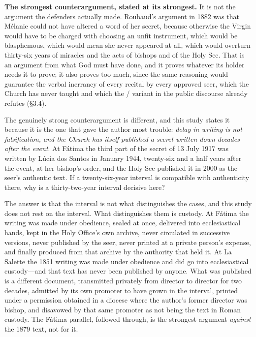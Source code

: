 \textbf{The strongest counterargument, stated at its strongest.}
It is not the argument the defenders actually made. Roubaud's
argument in 1882 was that Mélanie could not have altered a word of
her secret, because otherwise the Virgin would have to be charged
with choosing an unfit instrument, which would be blasphemous, which
would mean she never appeared at all, which would overturn
thirty-six years of miracles and the acts of bishops and of the Holy
See. That is an argument from what God must have done, and
it proves whatever its holder needs it to prove; it also proves too
much, since the same reasoning would guarantee the verbal inerrancy
of every recital by every approved seer, which the Church has never
taught and which the \slash{} variant in
the public discourse already refutes (\S3.4).

The genuinely strong counterargument is different, and this study
states it because it is the one that gave the author most trouble:
\emph{delay in writing is not falsification, and the Church has
itself published a secret written down decades after the event}. At
Fátima the third part of the secret of 13 July 1917 was written by
Lúcia dos Santos in January 1944, twenty-six and a half years after
the event, at her bishop's order, and the Holy See published it in
2000 as the seer's authentic text. If a twenty-six-year interval is
compatible with authenticity there, why is a thirty-two-year
interval decisive here?

The answer is that the interval is not what distinguishes the cases,
and this study does not rest on the interval. What distinguishes
them is custody. At Fátima the writing was made under obedience,
sealed at once, delivered into ecclesiastical hands, kept in the
Holy Office's own archive, never circulated in successive versions,
never published by the seer, never printed at a private person's
expense, and finally produced from that archive by the authority
that held it. At La Salette the 1851 writing was made under
obedience and did go into ecclesiastical custody---and that text has
never been published by anyone. What was published is a different
document, transmitted privately from director to director for two
decades, admitted by its own promoter to have grown in the interval,
printed under a permission obtained in a diocese where the author's
former director was bishop, and disavowed by that same promoter as
not being the text in Roman custody. The Fátima parallel, followed
through, is the strongest argument \emph{against} the 1879 text, not
for it.

